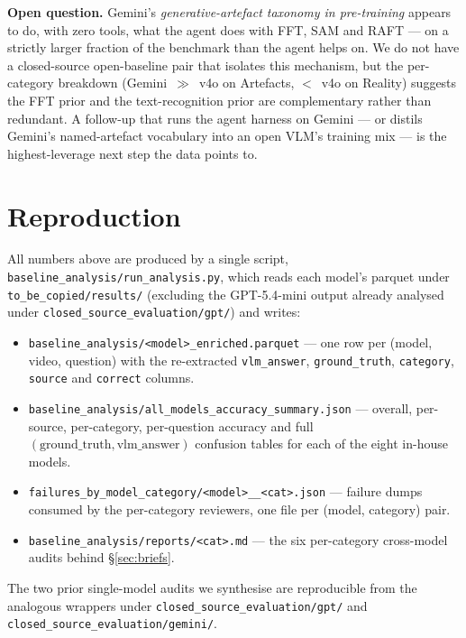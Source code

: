 \documentclass[11pt,a4paper]{article}
\newcommand{\code}[1]{\texttt{#1}}
\begin{document}
\textbf{Open question.} Gemini's
\emph{generative-artefact taxonomy in pre-training} appears to do, with
zero tools, what the agent does with FFT, SAM and RAFT --- on a
strictly larger fraction of the benchmark than the agent helps on. We
do not have a closed-source open-baseline pair that isolates this
mechanism, but the per-category breakdown (Gemini~$\gg$~v4o on
Artefacts, $<$~v4o on Reality) suggests the FFT prior and the
text-recognition prior are complementary rather than redundant. A
follow-up that runs the agent harness on Gemini --- or distils
Gemini's named-artefact vocabulary into an open VLM's training mix ---
is the highest-leverage next step the data points to.

\appendix
\section{Reproduction}
All numbers above are produced by a single script,
\code{baseline\_analysis/run\_analysis.py}, which reads each model's
parquet under \code{to\_be\_copied/results/} (excluding the
GPT-5.4-mini output already analysed under
\code{closed\_source\_evaluation/gpt/}) and writes:
\begin{itemize}
  \item \code{baseline\_analysis/<model>\_enriched.parquet} --- one row
  per (model, video, question) with the re-extracted
  \code{vlm\_answer}, \code{ground\_truth}, \code{category},
  \code{source} and \code{correct} columns.
  \item \code{baseline\_analysis/all\_models\_accuracy\_summary.json}
  --- overall, per-source, per-category, per-question accuracy and
  full $(\text{ground\_truth},\text{vlm\_answer})$ confusion tables for
  each of the eight in-house models.
  \item \code{failures\_by\_model\_category/<model>\_\_<cat>.json}
  --- failure dumps consumed by the per-category reviewers, one
  file per (model, category) pair.
  \item \code{baseline\_analysis/reports/<cat>.md} --- the six
  per-category cross-model audits behind \S\ref{sec:briefs}.
\end{itemize}
The two prior single-model audits we synthesise are reproducible from
the analogous wrappers under \code{closed\_source\_evaluation/gpt/} and
\code{closed\_source\_evaluation/gemini/}.
\end{document}

